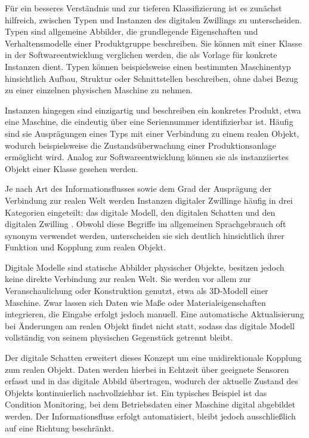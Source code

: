 Für ein besseres Verständnis und zur tieferen Klassifizierung ist es zunächst hilfreich, zwischen Typen und Instanzen des digitalen Zwillings zu unterscheiden.
Typen sind allgemeine Abbilder, die grundlegende Eigenschaften und Verhaltensmodelle einer Produktgruppe beschreiben. 
Sie können mit einer Klasse in der Softwareentwicklung verglichen werden, die als Vorlage für konkrete Instanzen dient.
Typen können beispielsweise einen bestimmten Maschinentyp hinsichtlich Aufbau, Struktur oder Schnittstellen beschreiben, ohne dabei Bezug zu einer einzelnen physischen Maschine zu nehmen.

Instanzen hingegen sind einzigartig und beschreiben ein konkretes Produkt, etwa eine Maschine, die eindeutig über eine Seriennummer identifizierbar ist.
Häufig sind sie Ausprägungen eines Typs mit einer Verbindung zu einem realen Objekt, wodurch beispielsweise die Zustandsüberwachung einer Produktionsanlage ermöglicht wird.
Analog zur Softwareentwicklung können sie als instanziiertes Objekt einer Klasse gesehen werden. \cite{ZEISS}

Je nach Art des Informationsflusses sowie dem Grad der Ausprägung der Verbindung zur realen Welt werden Instanzen digitaler Zwillinge häufig in drei Kategorien eingeteilt: das digitale Modell, den digitalen Schatten und den digitalen Zwilling \cite{ClassificationDT}.
Obwohl diese Begriffe im allgemeinen Sprachgebrauch oft synonym verwendet werden, unterscheiden sie sich deutlich hinsichtlich ihrer Funktion und Kopplung zum realen Objekt.

Digitale Modelle sind statische Abbilder physischer Objekte, besitzen jedoch keine direkte Verbindung zur realen Welt. 
Sie werden vor allem zur Veranschaulichung oder Konstruktion genutzt, etwa als 3D-Modell einer Maschine. 
Zwar lassen sich Daten wie Maße oder Materialeigenschaften integrieren, die Eingabe erfolgt jedoch manuell. 
Eine automatische Aktualisierung bei Änderungen am realen Objekt findet nicht statt, sodass das digitale Modell vollständig von seinem physischen Gegenstück getrennt bleibt.

Der digitale Schatten erweitert dieses Konzept um eine unidirektionale Kopplung zum realen Objekt. 
Daten werden hierbei in Echtzeit über geeignete Sensoren erfasst und in das digitale Abbild übertragen, wodurch der aktuelle Zustand des Objekts kontinuierlich nachvollziehbar ist. 
Ein typisches Beispiel ist das Condition Monitoring, bei dem Betriebsdaten einer Maschine digital abgebildet werden. 
Der Informationsfluss erfolgt automatisiert, bleibt jedoch ausschließlich auf eine Richtung beschränkt.

